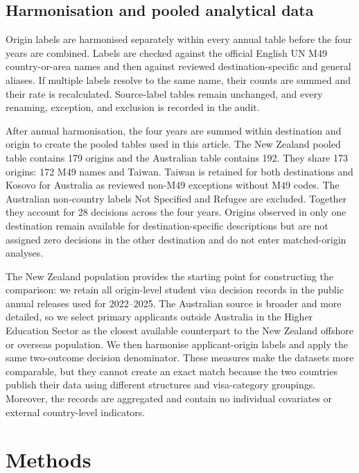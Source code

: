 \documentclass[runningheads]{llncs}
\begin{document}
\subsection{Harmonisation and pooled analytical data}

Origin labels are harmonised separately within every annual table before the four years are combined. Labels are checked against the official English UN M49 country-or-area names \cite{UNSDM49} and then against reviewed destination-specific and general aliases. If multiple labels resolve to the same name, their counts are summed and their rate is recalculated. Source-label tables remain unchanged, and every renaming, exception, and exclusion is recorded in the audit.

After annual harmonisation, the four years are summed within destination and origin to create the pooled tables used in this article. The New Zealand pooled table contains 179 origins and the Australian table contains 192. They share 173 origins: 172 M49 names and Taiwan. Taiwan is retained for both destinations and Kosovo for Australia as reviewed non-M49 exceptions without M49 codes. The Australian non-country labels Not Specified and Refugee are excluded. Together they account for 28 decisions across the four years. Origins observed in only one destination remain available for destination-specific descriptions but are not assigned zero decisions in the other destination and do not enter matched-origin analyses.

The New Zealand population provides the starting point for constructing the comparison: we retain all origin-level student visa decision records in the public annual releases used for 2022--2025. The Australian source is broader and more detailed, so we select primary applicants outside Australia in the Higher Education Sector as the closest available counterpart to the New Zealand offshore or overseas population. We then harmonise applicant-origin labels and apply the same two-outcome decision denominator. These measures make the datasets more comparable, but they cannot create an exact match because the two countries publish their data using different structures and visa-category groupings. Moreover, the records are aggregated and contain no individual covariates or external country-level indicators.

\section{Methods}
\end{document}
